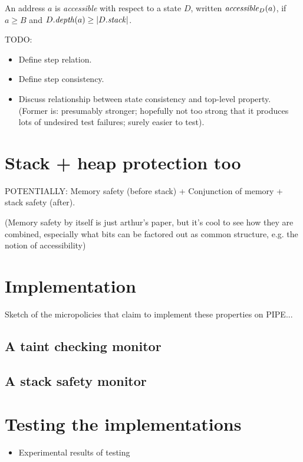 \documentclass[conference]{IEEEtran}
\begin{document}
An address $a$ is \emph{accessible} with respect to a state $D$, written $\relax{\it accessible}_{D}({a})$, if
$a \geq B$ and ${D}.\relax{\it depth}({a}) \geq \lvert{{D}.\relax{\it stack}}\rvert$.


TODO:
\begin{itemize}
\item
  Define step relation.
\item
  Define step consistency.
\item
  Discuss relationship between state consistency and top-level property.  (Former is: presumably stronger; hopefully not
  too strong that it produces lots of undesired test failures; surely easier to test).

\end{itemize}


\iftext
\section{Stack + heap protection too}

POTENTIALLY: Memory safety (before stack) + Conjunction of memory + stack
safety (after).

(Memory safety by itself is just arthur’s paper, but it’s cool to see how
they are combined, especially what bits can be factored out as common
structure, e.g. the notion of accessibility)
\fi

\section{Implementation}
\label{impl}

Sketch of the micropolicies that claim to implement these properties on
PIPE...

\subsection{A taint checking monitor}

\subsection{A stack safety monitor}

\section{Testing the implementations}

\begin{itemize}
\item Experimental results of testing
\end{itemize}
\end{document}
